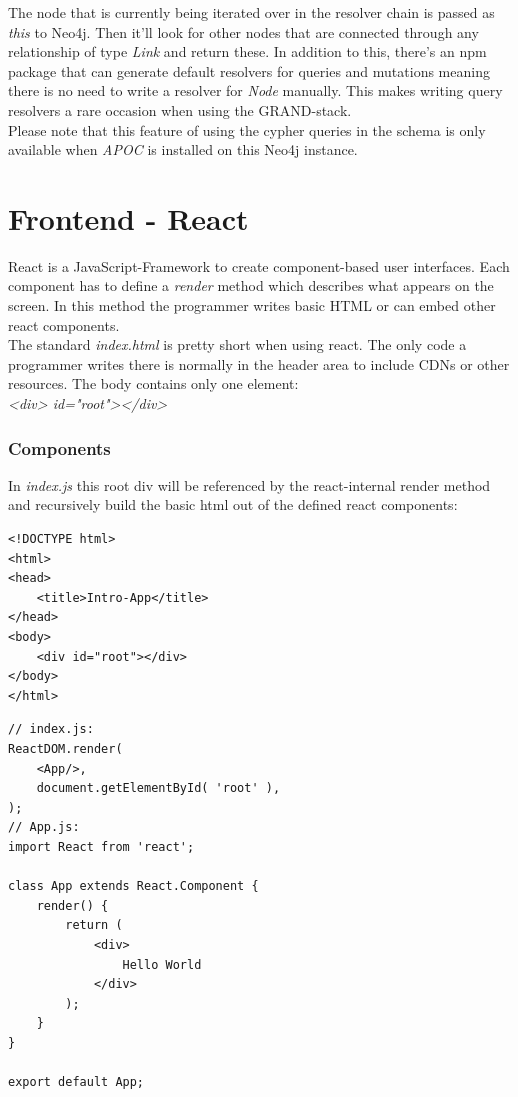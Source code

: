 The node that is currently being iterated over in the resolver chain is passed as \emph{this} to Neo4j. Then it'll look for other nodes that are connected through any relationship of type \emph{Link} and return these. In addition to this, there's an npm package that can generate default resolvers for queries and mutations meaning there is no need to write a resolver for \emph{Node} manually. This makes writing query resolvers a rare occasion when using the GRAND-stack. \\

Please note that this feature of using the cypher queries in the schema is only available when \emph{APOC} is installed on this Neo4j instance.

\section{Frontend - React}
React is a JavaScript-Framework to create component-based user interfaces. Each component has to define a \emph{render} method which describes what appears on the screen. In this method the programmer writes basic HTML or can embed other react components. \\
The standard \emph{index.html} is pretty short when using react. The only code a programmer writes there is normally in the header area to include CDNs or other resources. The body contains only one element: \\
\emph{<div> id="root"></div>} 

\subsubsection{Components}
In \emph{index.js} this root div will be referenced by the react-internal render method and recursively build the basic html out of the defined react components:
\lstset{language=HTML}
\begin{lstlisting}[caption={index.html for Hello World},label={ex250}]
<!DOCTYPE html>
<html>
<head>
	<title>Intro-App</title>
</head>
<body>
	<div id="root"></div>
</body>
</html>
\end{lstlisting}

\lstset{language=JavaScript}
\begin{lstlisting}[caption={Hello World in React},label={ex251}]
// index.js:
ReactDOM.render(
	<App/>,
	document.getElementById( 'root' ),
);
// App.js:
import React from 'react';

class App extends React.Component {
	render() {
		return (
			<div>
				Hello World
			</div>
		);
	}
}

export default App;
\end{lstlisting}


